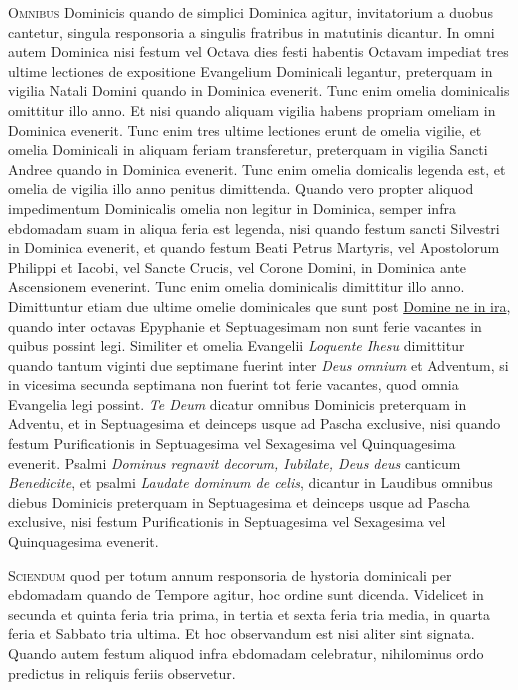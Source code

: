 \begin{multicols*}{2}
{\color{Red} }
\lettrine[lines=2]{\zallmancaps \color{Red} O}{mnibus} Dominicis quando de simplici Dominica agitur, invitatorium a duobus cantetur, singula responsoria a singulis fratribus in matutinis dicantur. In omni autem Dominica nisi festum vel Octava dies festi habentis Octavam impediat tres ultime lectiones de expositione Evangelium Dominicali legantur, preterquam in vigilia Natali Domini quando in Dominica evenerit.
Tunc enim omelia dominicalis omittitur illo anno. Et nisi quando aliquam vigilia habens propriam omeliam in Dominica evenerit. Tunc enim tres ultime lectiones erunt de omelia vigilie, et omelia Dominicali in aliquam feriam transferetur, preterquam in vigilia Sancti Andree quando in Dominica evenerit. Tunc enim omelia domicalis legenda est, et omelia de vigilia illo anno penitus dimittenda.
Quando vero propter aliquod impedimentum Dominicalis omelia non legitur in Dominica, semper infra ebdomadam suam in aliqua feria est legenda, nisi quando festum sancti Silvestri in Dominica evenerit, et quando festum Beati Petrus Martyris, vel Apostolorum Philippi et Iacobi, vel Sancte Crucis, vel Corone Domini, in Dominica ante Ascensionem evenerint. Tunc enim omelia dominicalis dimittitur illo anno. Dimittuntur etiam due ultime omelie dominicales que sunt post \hyperlink{domine-ne-in-ira}{Domine ne in ira}, quando inter octavas Epyphanie et Septuagesimam non sunt ferie vacantes in quibus possint legi. Similiter et omelia Evangelii \textit{Loquente Ihesu} dimittitur quando tantum viginti due septimane fuerint inter \textit{Deus omnium} et Adventum, si in vicesima secunda septimana non fuerint tot ferie vacantes, quod omnia Evangelia legi possint.
\textit{Te Deum} dicatur omnibus Dominicis preterquam in Adventu, et in Septuagesima et deinceps usque ad Pascha exclusive, nisi quando festum Purificationis in Septuagesima vel Sexagesima vel Quinquagesima evenerit.
Psalmi \textit{Dominus regnavit decorum, Iubilate, Deus deus} canticum \textit{Benedicite}, et psalmi \textit{Laudate dominum de celis}, dicantur in Laudibus omnibus diebus Dominicis preterquam in Septuagesima et deinceps usque ad Pascha exclusive, nisi festum Purificationis in Septuagesima vel Sexagesima vel Quinquagesima evenerit.

{\color{Red} }
\lettrine[lines=2]{\zallmancaps \color{Blue} S}{ciendum} quod per totum annum responsoria de hystoria dominicali per ebdomadam quando de Tempore agitur, hoc ordine sunt dicenda. Videlicet in secunda et quinta feria tria prima, in tertia et sexta feria tria media, in quarta feria et Sabbato tria ultima. Et hoc observandum est nisi aliter sint signata. Quando autem festum aliquod infra ebdomadam celebratur, nihilominus ordo predictus in reliquis feriis observetur.


\end{multicols*}
